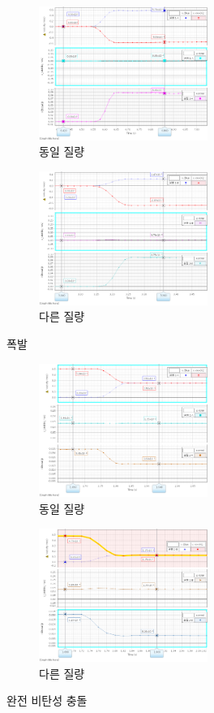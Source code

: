 \documentclass[12pt,a4paper]{article}
\begin{document}
\begin{figure}[!h]
    \centering
    \begin{subfigure}[]{0.4\textwidth}
        \includegraphics[height=4.36cm]{W10_1-A.png}
        \caption{\label{fig1-A}동일 질량}
    \end{subfigure}
    \begin{subfigure}[]{0.4\textwidth}
        \includegraphics[height=4.36cm]{W10_1-B.png}
        \caption{\label{fig1-B}다른 질량}
    \end{subfigure}
    \caption{\label{fig1}폭발}
\end{figure}
\begin{figure}[!h]
    \centering
    \begin{subfigure}[]{0.4\textwidth}
        \includegraphics[height=4.36cm]{W10_2-A.png}
        \caption{\label{fig2-A}동일 질량}
    \end{subfigure}
    \begin{subfigure}[]{0.4\textwidth}
        \includegraphics[height=4.36cm]{W10_2-B.png}
        \caption{\label{fig2-B}다른 질량}
    \end{subfigure}
    \caption{\label{fig2}완전 비탄성 충돌}
\end{figure}
\end{document}
